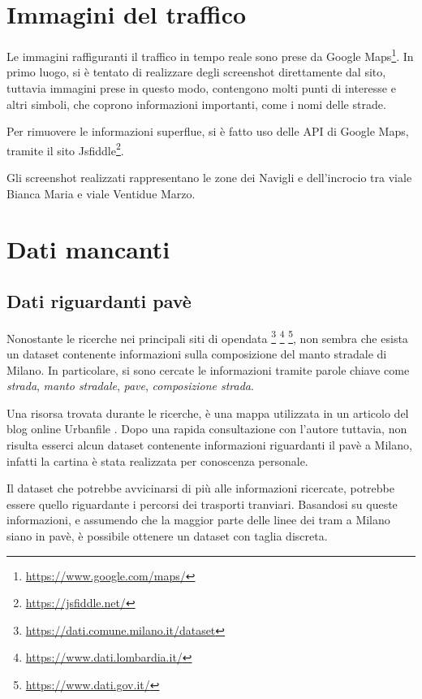 \documentclass[a4paper,12pt]{report}
\newcommand{\quotestyle}[1]{\textit{#1}}
\begin{document}
\section{Immagini del traffico}

Le immagini raffiguranti il traffico in tempo reale sono prese da Google 
Maps\footnote{\url{https://www.google.com/maps/}}. 
In primo luogo, si è tentato di realizzare degli screenshot direttamente dal sito, 
tuttavia immagini prese in questo modo, contengono molti punti di interesse e altri simboli, 
che coprono informazioni importanti, come i nomi delle strade.

Per rimuovere le informazioni superflue, si è fatto uso delle API di Google Maps, 
tramite il sito Jsfiddle\footnote{\url{https://jsfiddle.net/}}.

Gli screenshot realizzati rappresentano le zone dei Navigli e dell'incrocio tra viale 
Bianca Maria e viale Ventidue Marzo.

\section{Dati mancanti}

\subsection{Dati riguardanti pavè}

Nonostante le ricerche nei principali siti di opendata
\footnote{\url{https://dati.comune.milano.it/dataset}}
\footnote{\url{https://www.dati.lombardia.it/}}
\footnote{\url{https://www.dati.gov.it/}}, 
non sembra che esista un dataset contenente informazioni sulla composizione del 
manto stradale di Milano. 
In particolare, si sono cercate le informazioni tramite parole chiave come 
\quotestyle{strada}, \quotestyle{manto stradale}, \quotestyle{pave}, 
\quotestyle{composizione strada}.

Una risorsa trovata durante le ricerche, è una mappa utilizzata in un articolo del blog online 
Urbanfile \cite{URBANFILE:1}. 
Dopo una rapida consultazione con l'autore tuttavia, non risulta esserci alcun 
dataset contenente informazioni riguardanti il pavè a Milano, infatti la cartina è 
stata realizzata per conoscenza personale.

Il dataset che potrebbe avvicinarsi di più alle informazioni ricercate, 
potrebbe essere quello riguardante i percorsi dei trasporti tranviari. 
Basandosi su queste informazioni, e assumendo che la maggior parte delle linee dei 
tram a Milano siano in pavè, è possibile ottenere un dataset con taglia discreta.
\end{document}
